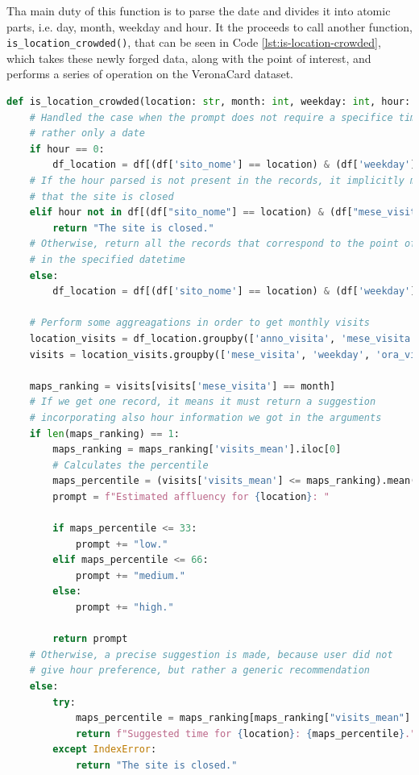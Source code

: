 Tha main duty of this function is to parse the date and divides it into atomic parts, i.e. day, month, weekday and hour. It the proceeds to call another function, \texttt{is\_location\_crowded()}, that can be seen in Code \ref{lst:is-location-crowded}, which takes these newly forged data, along with the point of interest, and performs a series of operation on the VeronaCard dataset.

\begin{center}
\begin{lstlisting}[language=Python, frame=single, caption=\texttt{is\_location\_crowded()} Function.]
def is_location_crowded(location: str, month: int, weekday: int, hour: int) -> str:
    # Handled the case when the prompt does not require a specifice time,
    # rather only a date
    if hour == 0:
        df_location = df[(df['sito_nome'] == location) & (df['weekday'] == int(weekday))]
    # If the hour parsed is not present in the records, it implicitly means
    # that the site is closed
    elif hour not in df[(df["sito_nome"] == location) & (df["mese_visita"] == month)]["ora_visita_intervallo"].unique():
        return "The site is closed."
    # Otherwise, return all the records that correspond to the point of interest
    # in the specified datetime
    else:
        df_location = df[(df['sito_nome'] == location) & (df['weekday'] == int(weekday)) & (df['ora_visita_intervallo'] == int(hour))]

    # Perform some aggreagations in order to get monthly visits
    location_visits = df_location.groupby(['anno_visita', 'mese_visita', 'weekday', 'ora_visita_intervallo']).size().reset_index(name='visits_number')
    visits = location_visits.groupby(['mese_visita', 'weekday', 'ora_visita_intervallo'])['visits_number'].mean().reset_index(name='visits_mean')

    maps_ranking = visits[visits['mese_visita'] == month]
    # If we get one record, it means it must return a suggestion
    # incorporating also hour information we got in the arguments
    if len(maps_ranking) == 1:
        maps_ranking = maps_ranking['visits_mean'].iloc[0]
        # Calculates the percentile
        maps_percentile = (visits['visits_mean'] <= maps_ranking).mean() * 100
        prompt = f"Estimated affluency for {location}: "

        if maps_percentile <= 33:
            prompt += "low."
        elif maps_percentile <= 66:
            prompt += "medium."
        else:
            prompt += "high."

        return prompt
    # Otherwise, a precise suggestion is made, because user did not
    # give hour preference, but rather a generic recommendation
    else:
        try:
            maps_percentile = maps_ranking[maps_ranking["visits_mean"] < maps_ranking["visits_mean"].median()].sort_values(by="ora_visita_intervallo")["ora_visita_intervallo"].iloc[0]
            return f"Suggested time for {location}: {maps_percentile}."
        except IndexError:
            return "The site is closed."
\end{lstlisting}
\label{lst:is-location-crowded}
\end{center}

